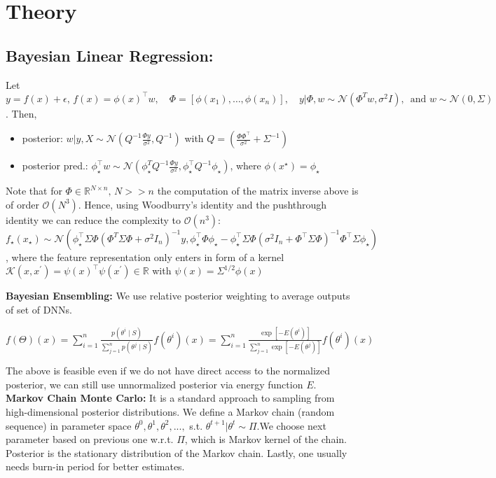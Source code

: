 \section{Theory}



\subsection{Bayesian Linear Regression:} 
Let  \(y=f(x) + \epsilon, \, f(x)=\phi(x)^\top w, \quad \Phi=[\phi(x_1), \ldots, \phi(x_n)], \quad y|\Phi, w\sim \mathcal{N}(\Phi^T w, \sigma^2 I), \, \text{ and } w\sim \mathcal{N}(0, \Sigma)\). Then,
\begin{itemize}
    \item posterior: \(w|y, X \sim \mathcal{N}\left(Q^{-1} \frac{\Phi y}{\sigma^2}, Q^{-1}\right)\) with \(Q = \left(\frac{\Phi \Phi^\top}{\sigma^2} + \Sigma^{-1}\right)\)
    \item posterior pred.: \(\phi_\star^\top w \sim \mathcal{N}\left(\phi_\star^T Q^{-1}\frac{\Phi y}{\sigma^2}, \phi_\star^\top Q^{-1} \phi_\star\right)\), where \(\phi(x^\star)=\phi_\star\)
\end{itemize}
Note that for \(\Phi \in \mathbb{R}^{N\times n}, \, N>>n\) the computation of the matrix inverse above is of order \(\mathcal{O}(N^3)\). Hence, using Woodburry's identity and the pushthrough identity we can reduce the complexity to \(\mathcal{O}(n^3)\):
\(f_\star(x_\star)\sim \mathcal{N}(\phi_\star ^\top \Sigma \Phi (\Phi^T \Sigma \Phi + \sigma^2 I_n)^{-1}y, \phi_\star^\top\Phi \phi_\star - \phi_\star^\top \Sigma\Phi(\sigma^2 I_n + \Phi^\top \Sigma \Phi)^{-1} \Phi^\top \Sigma \phi_\star)\), where the feature representation only enters in form of a kernel \(\mathcal{K}(x, x^\prime)=\psi(x)^\top \psi(x^\prime)\in \mathbb{R}\) with \(\psi(x)=\Sigma^{1/2}\phi(x)\)

\textbf{Bayesian Ensembling:} We use  relative posterior weighting to average outputs of set of DNNs. 

$
f(\Theta)(x) = \sum_{i=1}^{n} \frac{p(\theta^i \mid S)}{\sum_{j=1}^{n} p(\theta^j \mid S)} f(\theta^i)(x) = \sum_{i=1}^{n} \frac{\exp[-E(\theta^i)]}{\sum_{j=1}^{n} \exp[-E(\theta^j)]} f(\theta^i)(x)
$

The above is feasible even if we do not have direct access to the normalized posterior, we can still use unnormalized posterior via energy function $E$.\\
\textbf{Markov Chain Monte Carlo:} It is a standard approach to sampling from high-dimensional posterior distributions. We define a Markov chain (random sequence) in parameter space $\theta^0, \theta^1, \theta^2, ...,$ s.t. $\theta^{t+1} | \theta^t \sim \Pi$.We choose next parameter based on previous one w.r.t. $\Pi$, which is Markov kernel of the chain. Posterior is the stationary distribution of the Markov chain. Lastly, one usually needs burn-in period for better estimates.

